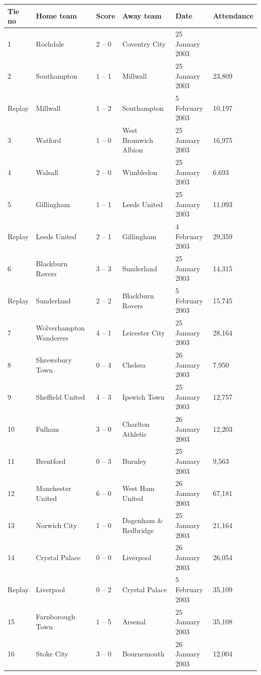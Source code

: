 \documentclass{article}
\begin{document}
\begin{tabular}{llllll}
\toprule
Tie no & Home team & Score & Away team & Date & Attendance \\
\midrule
1 & Rochdale & 2 – 0 & Coventry City & 25 January 2003 &  \\
2 & Southampton & 1 – 1 & Millwall & 25 January 2003 & 23,809 \\
Replay & Millwall & 1 – 2 & Southampton & 5 February 2003 & 10,197 \\
3 & Watford & 1 – 0 & West Bromwich Albion & 25 January 2003 & 16,975 \\
4 & Walsall & 2 – 0 & Wimbledon & 25 January 2003 & 6,693 \\
5 & Gillingham & 1 – 1 & Leeds United & 25 January 2003 & 11,093 \\
Replay & Leeds United & 2 – 1 & Gillingham & 4 February 2003 & 29,359 \\
6 & Blackburn Rovers & 3 – 3 & Sunderland & 25 January 2003 & 14,315 \\
Replay & Sunderland & 2 – 2 & Blackburn Rovers & 5 February 2003 & 15,745 \\
7 & Wolverhampton Wanderers & 4 – 1 & Leicester City & 25 January 2003 & 28,164 \\
8 & Shrewsbury Town & 0 – 4 & Chelsea & 26 January 2003 & 7,950 \\
9 & Sheffield United & 4 – 3 & Ipswich Town & 25 January 2003 & 12,757 \\
10 & Fulham & 3 – 0 & Charlton Athletic & 26 January 2003 & 12,203 \\
11 & Brentford & 0 – 3 & Burnley & 25 January 2003 & 9,563 \\
12 & Manchester United & 6 – 0 & West Ham United & 26 January 2003 & 67,181 \\
13 & Norwich City & 1 – 0 & Dagenham \& Redbridge & 25 January 2003 & 21,164 \\
14 & Crystal Palace & 0 – 0 & Liverpool & 26 January 2003 & 26,054 \\
Replay & Liverpool & 0 – 2 & Crystal Palace & 5 February 2003 & 35,109 \\
15 & Farnborough Town & 1 – 5 & Arsenal & 25 January 2003 & 35,108 \\
16 & Stoke City & 3 – 0 & Bournemouth & 26 January 2003 & 12,004 \\
\bottomrule
\end{tabular}
\end{document}
